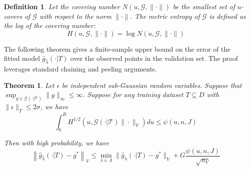 \documentclass[12pt]{article}
\newtheorem{theorem}{Theorem}
\newtheorem{definition}{Definition}
\begin{document}
\begin{definition}
Let the covering number $N(u, \mathcal{G}, \| \cdot \|)$ be the smallest set of $u$-covers of $\mathcal{G}$ with respect to the norm $\| \cdot \|$. The metric entropy of $\mathcal{G}$ is defined as the log of the covering number:
\begin{equation}
H (u, \mathcal{G}, \| \cdot \| ) = \log N(u, \mathcal{G}, \| \cdot \|)
\end{equation}
\end{definition}

The following theorem gives a finite-sample upper bound on the error of the fitted model $\hat{g}_{\hat \lambda}(\cdot | T)$ over the observed points in the validation set. The proof leverages standard chaining and peeling arguments.

\begin{theorem}
\label{train_val_thrm}
Let $\epsilon$ be independent sub-Gaussian random variables. 
Suppose that $\sup_{g \in \mathcal{G(\cdot | T)}} \| g \|_\infty \le \infty$.
Suppose for any training dataset $T \subseteq D$ with $\| \epsilon \|_T \le 2 \sigma$, we have
\begin{equation}
\int_0^R H^{1/2} \left ( u, \mathcal{G(\cdot | T)} \| \cdot \|_V \right ) du \le \psi(u, n, J)
\end{equation}

Then with high probability, we have
\begin{equation}
\label{error_bound}
\left \|\hat{g}_{\hat{\lambda} }(\cdot | T) - g^* \right \|_V
\le 
\min_{\lambda \in \Lambda}\| \hat{g}_{\lambda}(\cdot | T) - g^*\|_V
+ G \frac{\psi(u, n, J)}{\sqrt{n_V}}
\end{equation}
\end{theorem}
\end{document}

